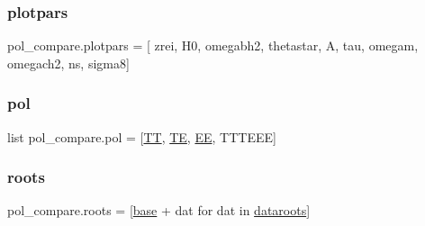 \mbox{\label{namespacepol__compare_a99f5ae846a44ea5cab883c2ea4614151}} 
\subsubsection{\texorpdfstring{plotpars}{plotpars}}
{\footnotesize\ttfamily pol\+\_\+compare.\+plotpars = \mbox{[} \textquotesingle{}zrei\textquotesingle{}, \textquotesingle{}H0\textquotesingle{}, \textquotesingle{}omegabh2\textquotesingle{}, \textquotesingle{}thetastar\textquotesingle{}, \textquotesingle{}A\textquotesingle{}, \textquotesingle{}tau\textquotesingle{}, \textquotesingle{}omegam\textquotesingle{}, \textquotesingle{}omegach2\textquotesingle{}, \textquotesingle{}ns\textquotesingle{}, \textquotesingle{}sigma8\textquotesingle{}\mbox{]}}

\mbox{\label{namespacepol__compare_ac502641a8be0e221c76c18a633e1184e}} 
\subsubsection{\texorpdfstring{pol}{pol}}
{\footnotesize\ttfamily list pol\+\_\+compare.\+pol = \mbox{[}\textquotesingle{}\mbox{\hyperlink{plotTT_8m_a2f803268a6367d0943978eb5f84cc62e}{TT}}\textquotesingle{}, \textquotesingle{}\mbox{\hyperlink{plotdiffs_8m_a1a5b2ac8f21dd2ac3d0605ff0b067ec4}{TE}}\textquotesingle{}, \textquotesingle{}\mbox{\hyperlink{plotdiffs_8m_a6f96ba8525cc2f838c7d8b6888a1481b}{EE}}\textquotesingle{}, \textquotesingle{}T\+T\+T\+E\+EE\textquotesingle{}\mbox{]}}

\mbox{\label{namespacepol__compare_aa10296f428d464dc29b6a291e8282386}} 
\subsubsection{\texorpdfstring{roots}{roots}}
{\footnotesize\ttfamily pol\+\_\+compare.\+roots = \mbox{[}\mbox{\hyperlink{namespacepol__compare_a8ff59771278ec8aef743aaecde372138}{base}} + dat for dat in \mbox{\hyperlink{namespacepol__compare_a51c9574c50b405f7b051e08d93459da2}{dataroots}}\mbox{]}}

